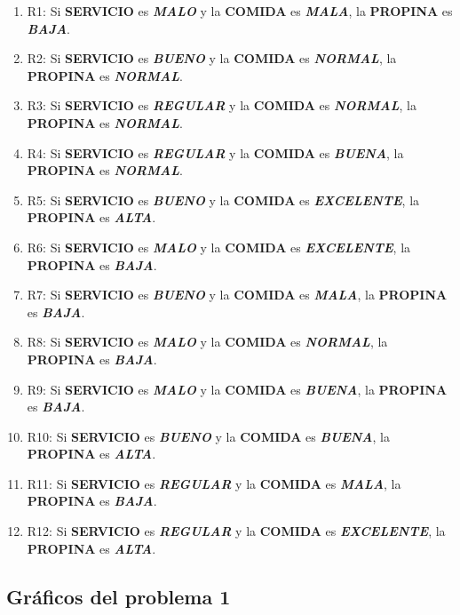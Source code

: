 \documentclass[11pt, letterpaper]{article}
\begin{document}
\begin{enumerate}
	\item R1: Si \textbf{SERVICIO} es \textbf{\textit{MALO}} y la \textbf{COMIDA} es \textbf{\textit{MALA}}, la \textbf{PROPINA} es \textbf{\textit{BAJA}}.
	\item R2: Si \textbf{SERVICIO} es \textbf{\textit{BUENO}} y la \textbf{COMIDA} es \textbf{\textit{NORMAL}}, la \textbf{PROPINA} es \textbf{\textit{NORMAL}}.
	\item R3: Si \textbf{SERVICIO} es \textbf{\textit{REGULAR}} y la \textbf{COMIDA} es \textbf{\textit{NORMAL}}, la \textbf{PROPINA} es \textbf{\textit{NORMAL}}.
	\item R4: Si \textbf{SERVICIO} es \textbf{\textit{REGULAR}} y la \textbf{COMIDA} es \textbf{\textit{BUENA}}, la \textbf{PROPINA} es \textbf{\textit{NORMAL}}.
	\item R5: Si \textbf{SERVICIO} es \textbf{\textit{BUENO}} y la \textbf{COMIDA} es \textbf{\textit{EXCELENTE}}, la \textbf{PROPINA} es \textbf{\textit{ALTA}}.
	\item R6: Si \textbf{SERVICIO} es \textbf{\textit{MALO}} y la \textbf{COMIDA} es \textbf{\textit{EXCELENTE}}, la \textbf{PROPINA} es \textbf{\textit{BAJA}}.
	\item R7: Si \textbf{SERVICIO} es \textbf{\textit{BUENO}} y la \textbf{COMIDA} es \textbf{\textit{MALA}}, la \textbf{PROPINA} es \textbf{\textit{BAJA}}.
	\item R8: Si \textbf{SERVICIO} es \textbf{\textit{MALO}} y la \textbf{COMIDA} es \textbf{\textit{NORMAL}}, la \textbf{PROPINA} es \textbf{\textit{BAJA}}.
	\item R9: Si \textbf{SERVICIO} es \textbf{\textit{MALO}} y la \textbf{COMIDA} es \textbf{\textit{BUENA}}, la \textbf{PROPINA} es \textbf{\textit{BAJA}}.
	\item R10: Si \textbf{SERVICIO} es \textbf{\textit{BUENO}} y la \textbf{COMIDA} es \textbf{\textit{BUENA}}, la \textbf{PROPINA} es \textbf{\textit{ALTA}}.
	\item R11: Si \textbf{SERVICIO} es \textbf{\textit{REGULAR}} y la \textbf{COMIDA} es \textbf{\textit{MALA}}, la \textbf{PROPINA} es \textbf{\textit{BAJA}}.
	\item R12: Si \textbf{SERVICIO} es \textbf{\textit{REGULAR}} y la \textbf{COMIDA} es \textbf{\textit{EXCELENTE}}, la \textbf{PROPINA} es \textbf{\textit{ALTA}}.
\end{enumerate}

\newpage

\subsection{Gráficos del problema 1}
\end{document}
